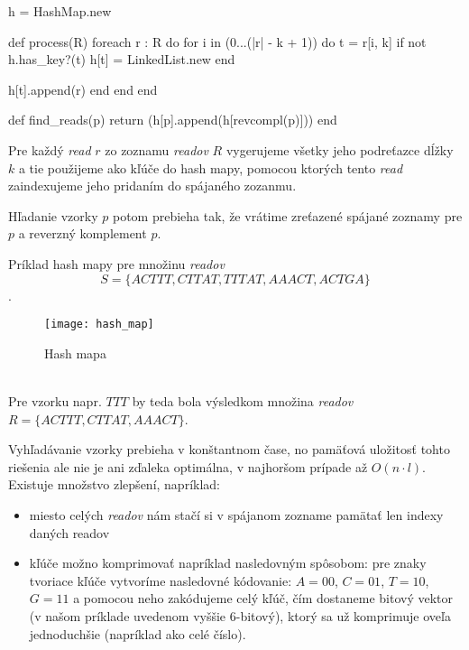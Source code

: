 \begin{pseudocode}[label=lst:hash_algorithm,caption={Algoritmus na riešenie
problému zarovnania readov pomocou hash mapy}]
h = HashMap.new

def process(R)
  foreach r : R do
    for i in (0...(|r| - k + 1)) do
      t = r[i, k]
      if not h.has_key?(t)
        h[t] = LinkedList.new
      end
        
      h[t].append(r)
    end 
  end
end

def find_reads(p)
  return (h[p].append(h[revcompl(p)]))
end
\end{pseudocode}

Pre každý \emph{read} $r$ zo zoznamu \emph{readov} $R$ vygerujeme všetky jeho
podreťazce dĺžky $k$ a tie použijeme ako kľúče do hash mapy, pomocou ktorých
tento \emph{read} zaindexujeme jeho pridaním do spájaného zozanmu.

Hľadanie vzorky $p$ potom prebieha tak, že vrátime zreťazené spájané
zoznamy pre $p$ a reverzný komplement $p$.

\begin{example}
    Príklad hash mapy pre množinu \emph{readov} $$S = \{ACTTT, CTTAT, TTTAT,
    AAACT, ACTGA\}$$.
    \begin{figure}[h]
        \centering
        \texttt{[image: hash\_map]}
        \caption{Hash mapa}
        \label{fig:hash_map}
    \end{figure}
    \\
    Pre vzorku napr. $TTT$ by teda bola výsledkom množina \emph{readov} $R =
    \{ACTTT, CTTAT, AAACT\}$.
\end{example}

Vyhľadávanie vzorky prebieha v konštantnom čase, no pamäťová uložitosť tohto
riešenia ale nie je ani zďaleka optimálna, v najhoršom prípade až $O(n \cdot
l)$. Existuje množstvo zlepšení, napríklad:

\begin{itemize}
    \item miesto celých \emph{readov} nám stačí si v spájanom zozname
    pamätať len indexy daných readov
    \item kľúče možno komprimovať napríklad nasledovným spôsobom: pre znaky
    tvoriace kľúče vytvoríme nasledovné kódovanie: $A = 00$, $C = 01$, $T = 10$,
    $G = 11$ a pomocou neho zakódujeme celý kľúč, čím dostaneme bitový vektor
    (v našom príklade uvedenom vyššie 6-bitový), ktorý sa už komprimuje oveľa
    jednoduchšie (napríklad ako celé číslo).
\end{itemize}

